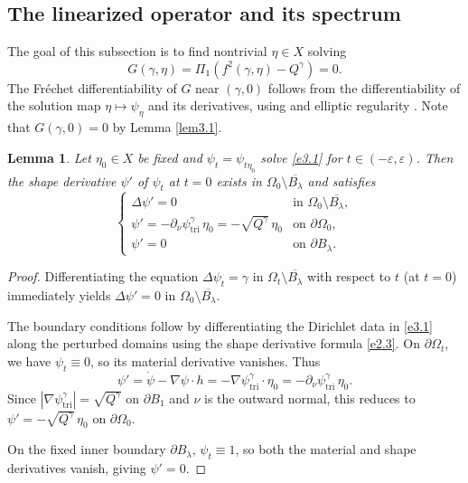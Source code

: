 \documentclass[reqno]{amsart}
\numberwithin{equation}{section}
\newtheorem{lemma}[theorem]{Lemma}
\numberwithin{equation}{section}
\numberwithin{equation}{section}
\begin{document}
\subsection{The linearized operator and its spectrum}

The goal of this subsection is to find nontrivial \(\eta \in X\) solving
\begin{equation}\label{e3.4}
G(\gamma, \eta) = \Pi_1\left( f^2(\gamma, \eta) - Q^\gamma\right) = 0.
\end{equation}
The Fr\'{e}chet differentiability of \(G\) near \((\gamma, 0)\) follows from the differentiability of the solution map \(\eta \mapsto \psi_\eta\) and its derivatives, using \cite[Theorem 5.3.2]{HenrotP} and elliptic regularity \cite{Gilbarg}. Note that \(G(\gamma, 0) = 0\) by Lemma \ref{lem3.1}.

\begin{lemma}\label{lem3.2}
Let \(\eta_0 \in X\) be fixed and \(\psi_t = \psi_{t\eta_0}\) solve \eqref{e3.1} for \(t \in (-\varepsilon, \varepsilon)\). Then the shape derivative \(\psi'\) of \(\psi_t\) at \(t=0\) exists in \(\Omega_0 \setminus \overline{B_\lambda}\) and satisfies
\begin{equation}\label{e3.5}
\begin{cases}
\Delta \psi' = 0 & \text{in } \Omega_0 \setminus \overline{B_\lambda}, \\
\psi' = -\partial_\nu \psi^\gamma_\mathrm{tri} \, \eta_0 = -\sqrt{Q^\gamma} \, \eta_0 & \text{on } \partial \Omega_0, \\
\psi' = 0 & \text{on } \partial B_\lambda.
\end{cases}
\end{equation}
\end{lemma}

\begin{proof}
Differentiating the equation \(\Delta \psi_t = \gamma\) in \(\Omega_t \setminus \overline{B_\lambda}\) with respect to \(t\) (at \(t=0\)) immediately yields \(\Delta \psi' = 0\) in \(\Omega_0 \setminus \overline{B_\lambda}\).

The boundary conditions follow by differentiating the Dirichlet data in \eqref{e3.1} along the perturbed domains using the shape derivative formula \eqref{e2.3}. On \(\partial \Omega_t\), we have \(\psi_t \equiv 0\), so its material derivative vanishes. Thus
\[
\psi' = \dot{\psi} - \nabla \psi \cdot h = -\nabla \psi^\gamma_\mathrm{tri} \cdot \eta_0 = -\partial_\nu \psi^\gamma_\mathrm{tri} \, \eta_0.
\]
Since \(|\nabla \psi^\gamma_\mathrm{tri}| = \sqrt{Q^\gamma}\) on \(\partial B_1\) and \(\nu\) is the outward normal, this reduces to \(\psi' = -\sqrt{Q^\gamma} \, \eta_0\) on \(\partial \Omega_0\).

On the fixed inner boundary \(\partial B_\lambda\), \(\psi_t \equiv 1\), so both the material and shape derivatives vanish, giving \(\psi' = 0\).
\end{proof}
\end{document}
